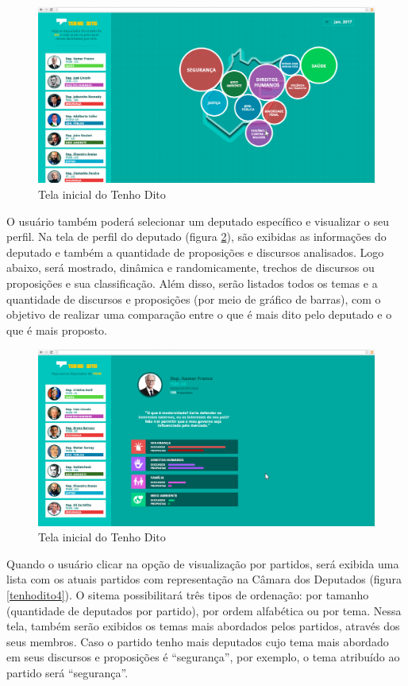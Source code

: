\begin{apendicesenv}
\begin{figure}[h]
  \centering
  \includegraphics[scale=0.2]{figuras/tenhodito2.eps}
  \caption{Tela inicial do Tenho Dito}
  \label{tenhodito2}
\end{figure}

O usuário também poderá selecionar um deputado específico e visualizar o seu perfil. Na tela de perfil do deputado (figura \ref{tenhodito3}), são exibidas as informações do deputado e também a quantidade de proposições e discursos analisados. Logo abaixo, será mostrado, dinâmica e randomicamente, trechos de discursos ou proposições e sua classificação. Além disso, serão listados todos os temas e a quantidade de discursos e proposições (por meio de gráfico de barras), com o objetivo de realizar uma comparação entre o que é mais dito pelo deputado e o que é mais proposto.

\begin{figure}[h]
  \centering
  \includegraphics[scale=0.2]{figuras/tenhodito3.eps}
  \caption{Tela inicial do Tenho Dito}
  \label{tenhodito3}
\end{figure}

Quando o usuário clicar na opção de visualização por partidos, será exibida uma lista com os atuais partidos com representação na Câmara dos Deputados (figura \ref{tenhodito4}). O sitema possibilitará três tipos de ordenação: por tamanho (quantidade de deputados por partido), por ordem alfabética ou por tema. Nessa tela, também serão exibidos os temas mais abordados pelos partidos, através dos seus membros. Caso o partido tenho mais deputados cujo tema mais abordado em seus discursos e proposições é ``segurança'', por exemplo, o tema atribuído ao partido será ``segurança''.


\end{apendicesenv}
